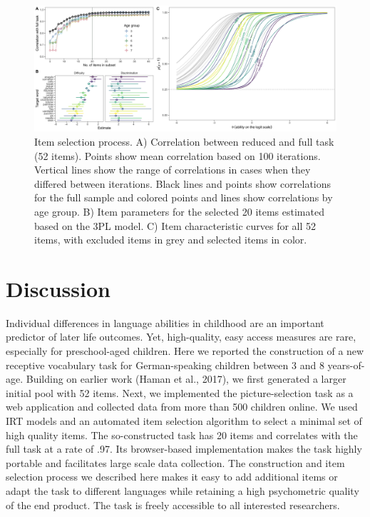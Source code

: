 \documentclass[
  man,floatsintext]{apa6}
\begin{document}
\begin{figure}

{\centering \includegraphics[width=1\linewidth]{../graphs/item_fig2} 

}

\caption{Item selection process. A) Correlation between reduced and full task (52 items). Points show mean correlation based on 100 iterations. Vertical lines show the range of correlations in cases when they differed between iterations. Black lines and points show correlations for the full sample and colored points and lines show correlations by age group. B) Item parameters for the selected 20 items estimated based on the 3PL model. C) Item characteristic curves for all 52 items, with excluded items in grey and selected items in color.}\label{fig:fig4}
\end{figure}

\hypertarget{discussion}{%
\section{Discussion}\label{discussion}}

Individual differences in language abilities in childhood are an important predictor of later life outcomes. Yet, high-quality, easy access measures are rare, especially for preschool-aged children. Here we reported the construction of a new receptive vocabulary task for German-speaking children between 3 and 8 years-of-age. Building on earlier work (Haman et al., 2017), we first generated a larger initial pool with 52 items. Next, we implemented the picture-selection task as a web application and collected data from more than 500 children online. We used IRT models and an automated item selection algorithm to select a minimal set of high quality items. The so-constructed task has 20 items and correlates with the full task at a rate of .97. Its browser-based implementation makes the task highly portable and facilitates large scale data collection. The construction and item selection process we described here makes it easy to add additional items or adapt the task to different languages while retaining a high psychometric quality of the end product. The task is freely accessible to all interested researchers.
\end{document}
